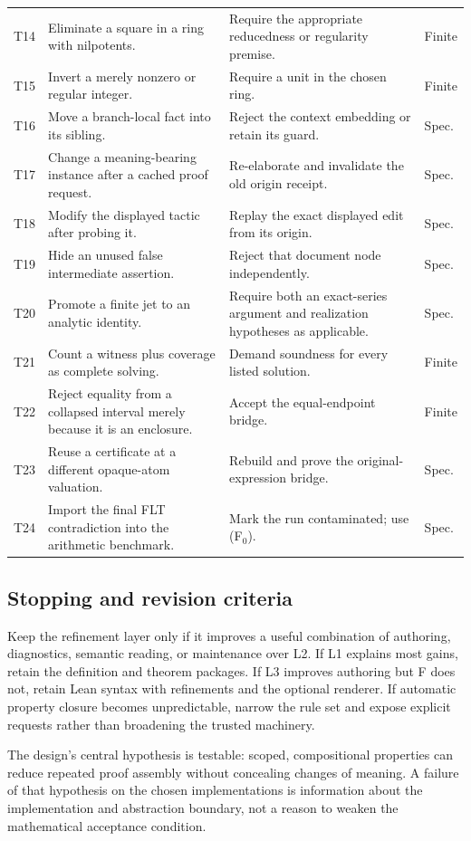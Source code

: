 \documentclass[11pt,letterpaper]{article}
\theoremstyle{definition}\newtheorem{definition}[theorem]{Definition}
\begin{document}
\begin{longtable}{@{}L{0.42in}L{2.13in}L{2.92in}L{0.48in}@{}}
T14 & Eliminate a square in a ring with nilpotents. & Require the appropriate reducedness or regularity premise. & Finite\\
T15 & Invert a merely nonzero or regular integer. & Require a unit in the chosen ring. & Finite\\
T16 & Move a branch-local fact into its sibling. & Reject the context embedding or retain its guard. & Spec.\\
T17 & Change a meaning-bearing instance after a cached proof request. & Re-elaborate and invalidate the old origin receipt. & Spec.\\
T18 & Modify the displayed tactic after probing it. & Replay the exact displayed edit from its origin. & Spec.\\
T19 & Hide an unused false intermediate assertion. & Reject that document node independently. & Spec.\\
T20 & Promote a finite jet to an analytic identity. & Require both an exact-series argument and realization hypotheses as applicable. & Spec.\\
T21 & Count a witness plus coverage as complete solving. & Demand soundness for every listed solution. & Finite\\
T22 & Reject equality from a collapsed interval merely because it is an enclosure. & Accept the equal-endpoint bridge. & Finite\\
T23 & Reuse a certificate at a different opaque-atom valuation. & Rebuild and prove the original-expression bridge. & Spec.\\
T24 & Import the final FLT contradiction into the arithmetic benchmark. & Mark the run contaminated; use (F$_0$). & Spec.\\
\bottomrule
\end{longtable}
\normalsize

\subsection{Stopping and revision criteria}
Keep the refinement layer only if it improves a useful combination of authoring, diagnostics, semantic reading, or maintenance over L2. If L1 explains most gains, retain the definition and theorem packages. If L3 improves authoring but F does not, retain Lean syntax with refinements and the optional renderer. If automatic property closure becomes unpredictable, narrow the rule set and expose explicit requests rather than broadening the trusted machinery.

The design's central hypothesis is testable: scoped, compositional properties can reduce repeated proof assembly without concealing changes of meaning. A failure of that hypothesis on the chosen implementations is information about the implementation and abstraction boundary, not a reason to weaken the mathematical acceptance condition.
\end{document}

